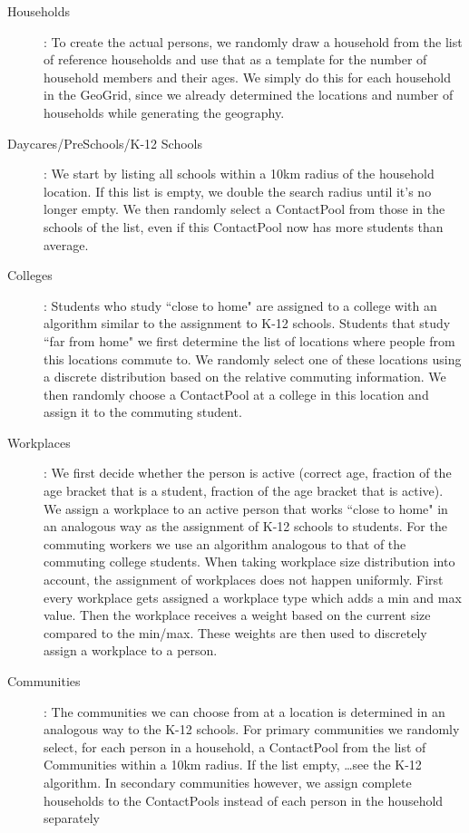 \begin{description}
    \item[Households]:
        To create the actual persons, we randomly draw a household from the list of reference households 
        and use that as a template for the number of household members and their ages.
        We simply do this for each household in the GeoGrid, since we already determined 
        the locations and number of households while generating the geography.
        
    \item[Daycares/PreSchools/K-12 Schools]:
        We start by listing all schools within a 10km radius of the household location. 
        If this list is empty, we double the search radius until it's no longer empty.
        We then randomly select a ContactPool from those in the schools of the list,
       even if this ContactPool now has more students than average.
    \item[Colleges]:
        Students who study ``close to home" are assigned to a college with an algorithm
        similar to the assignment to K-12 schools.
        Students that study ``far from home" we first determine the list of locations 
        where people from this locations commute to. We randomly select one of these locations 
        using a discrete distribution based on the relative commuting information.
        We then randomly choose a ContactPool at a college in this location and assign it to 
        the commuting student.
    \item[Workplaces]:
        We first decide whether the person is active (correct age, fraction of the age bracket that is a student,
        fraction of the age bracket that is active).
        We assign a workplace to an active person that works ``close to home" in an 
        analogous way as the assignment of K-12 schools to students.
        For the commuting workers we use an algorithm analogous to that of the commuting college students. When taking workplace size distribution into account, the assignment of workplaces does not happen uniformly. First every workplace gets assigned a workplace type which adds a min and max value. Then the workplace receives a weight based on the current size compared to the min/max. These weights are then used to discretely assign a workplace to a person.
    \item[Communities]:
        The communities we can choose from at a location is determined in an analogous 
        way to the K-12 schools.
        For primary communities we randomly select, for each person in a household, a ContactPool 
        from the list of Communities within a 10km radius. If the list empty, \ldots see the K-12 algorithm.
        In secondary communities however, we assign complete households to the 
        ContactPools instead of each person in the household separately
\end{description}

